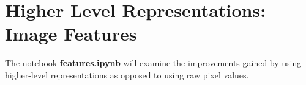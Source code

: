 \section{Higher Level Representations: Image Features}

The notebook \textbf{features.ipynb} will examine the improvements gained by using higher-level representations as opposed to using raw pixel values.